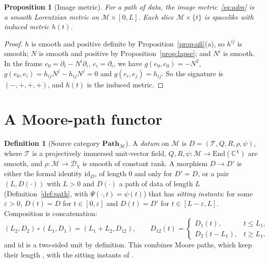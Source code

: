 \documentclass[11pt,a4paper,reqno]{amsart}
\newtheorem{proposition}[theorem]{Proposition}
\theoremstyle{definition}
\newtheorem{definition}[theorem]{Definition}
\numberwithin{equation}{section}
\newcommand{\C}{\mathbb{C}}
\newcommand{\End}{\mathrm{End}}
\newcommand{\Path}{\mathbf{Path}_{\mathcal{M}}}
\newcommand{\Dens}{\mathcal{D}_\chi}
\begin{document}
\begin{proposition}[Image metric]\label{prop:lorentz}
For a path of data, the image metric~\eqref{eq:adm} is a smooth Lorentzian metric on $\mathcal{M}\times[0,L]$. Each slice $\mathcal{M}\times\{t\}$ is spacelike with induced metric $h(t)$.
\end{proposition}

\begin{proof}
$h$ is smooth and positive definite by Proposition~\ref{prop:qfi}(a), so $h^{ij}$ is smooth; $N$ is smooth and positive by Proposition~\ref{prop:lapse}; and $N^i$ is smooth. In the frame $e_0=\partial_t-N^i\partial_i$, $e_i=\partial_i$, we have $g(e_0,e_0)=-N^2$, $g(e_0,e_i)=h_{ij}N^j-h_{ij}N^j=0$ and $g(e_i,e_j)=h_{ij}$. So the signature is $(-,+,+,+)$, and $h(t)$ is the induced metric.
\end{proof}

\section{A Moore-path functor}
\label{sec:moore}

\begin{definition}[Source category $\Path$]\label{def:pathcat}
A \emph{datum} on $\mathcal{M}$ is $D=(\mathcal{T},Q,R,\rho,\psi)$, where $\mathcal{T}$ is a projectively immersed unit-vector field, $Q,R,\psi:\mathcal{M}\to\End(\C^\chi)$ are smooth, and $\rho:\mathcal{M}\to\Dens$ is smooth of constant rank. A morphism $D\to D'$ is either the formal identity $\mathrm{id}_D$, of length $0$ and only for $D'=D$, or a pair $(L,D(\cdot))$ with $L>0$ and $D(\cdot)$ a path of data of length $L$ (Definition~\ref{def:path}, with $\Psi(\cdot,t)=\psi(t)$) that has \emph{sitting instants}: for some $\varepsilon>0$, $D(t)=D$ for $t\in[0,\varepsilon]$ and $D(t)=D'$ for $t\in[L-\varepsilon,L]$. Composition is concatenation:
\[
(L_2,D_2)\circ(L_1,D_1)=(L_1+L_2,D_{12}),\qquad D_{12}(t)=\begin{cases}D_1(t),&t\le L_1,\\ D_2(t-L_1),&t\ge L_1,\end{cases}
\]
and $\mathrm{id}$ is a two-sided unit by definition. This combines Moore paths, which keep their length \cite[Secs.~3.4 and~6.1]{brown2006}, with the sitting instants of \cite[Def.~2.1]{schreiber2009}.
\end{definition}
\end{document}
